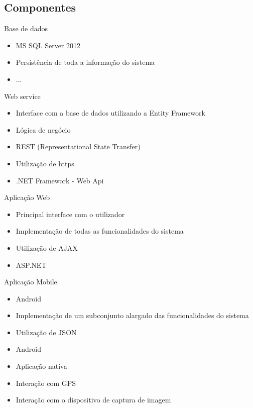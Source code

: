 \documentclass[portuges]{beamer}
\begin{document}
\subsection{Componentes}

\begin{frame}{Base de dados}
 \begin{itemize}
 \item MS SQL Server 2012
 \item Persistência de toda a informação do sistema
 \item ...
 \end{itemize}
\end{frame}

\begin{frame}{Web service}
 \begin{itemize}
 \item Interface com a base de dados utilizando a Entity Framework
 \item Lógica de negócio
 \item REST (Representational State Transfer)
 \item Utilização de https
 \item .NET Framework - Web Api 
 \end{itemize}
\end{frame}

\begin{frame}{Aplicação Web}
 \begin{itemize}
 \item Principal interface com o utilizador
 \item Implementação de todas as funcionalidades do sistema
 \item Utilização de AJAX
 \item ASP.NET 
 \end{itemize}
\end{frame}

\begin{frame}{Aplicação Mobile}
 \begin{itemize}
 \item Android
 \item Implementação de um subconjunto alargado das funcionalidades do sistema
 \item Utilização de JSON
 \item Android
 \item Aplicação nativa
 \item Interação com GPS
 \item Interação com o dispositivo de captura de imagem
 \end{itemize}
\end{frame}
\end{document}

